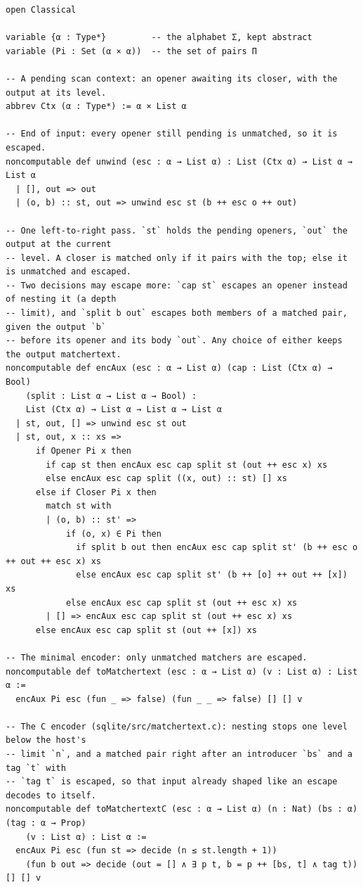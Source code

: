 \begin{lstlisting}
open Classical

variable {α : Type*}         -- the alphabet Σ, kept abstract
variable (Pi : Set (α × α))  -- the set of pairs Π

-- A pending scan context: an opener awaiting its closer, with the output at its level.
abbrev Ctx (α : Type*) := α × List α

-- End of input: every opener still pending is unmatched, so it is escaped.
noncomputable def unwind (esc : α → List α) : List (Ctx α) → List α → List α
  | [], out => out
  | (o, b) :: st, out => unwind esc st (b ++ esc o ++ out)

-- One left-to-right pass. `st` holds the pending openers, `out` the output at the current
-- level. A closer is matched only if it pairs with the top; else it is unmatched and escaped.
-- Two decisions may escape more: `cap st` escapes an opener instead of nesting it (a depth
-- limit), and `split b out` escapes both members of a matched pair, given the output `b`
-- before its opener and its body `out`. Any choice of either keeps the output matchertext.
noncomputable def encAux (esc : α → List α) (cap : List (Ctx α) → Bool)
    (split : List α → List α → Bool) :
    List (Ctx α) → List α → List α → List α
  | st, out, [] => unwind esc st out
  | st, out, x :: xs =>
      if Opener Pi x then
        if cap st then encAux esc cap split st (out ++ esc x) xs
        else encAux esc cap split ((x, out) :: st) [] xs
      else if Closer Pi x then
        match st with
        | (o, b) :: st' =>
            if (o, x) ∈ Pi then
              if split b out then encAux esc cap split st' (b ++ esc o ++ out ++ esc x) xs
              else encAux esc cap split st' (b ++ [o] ++ out ++ [x]) xs
            else encAux esc cap split st (out ++ esc x) xs
        | [] => encAux esc cap split st (out ++ esc x) xs
      else encAux esc cap split st (out ++ [x]) xs

-- The minimal encoder: only unmatched matchers are escaped.
noncomputable def toMatchertext (esc : α → List α) (v : List α) : List α :=
  encAux Pi esc (fun _ => false) (fun _ _ => false) [] [] v

-- The C encoder (sqlite/src/matchertext.c): nesting stops one level below the host's
-- limit `n`, and a matched pair right after an introducer `bs` and a tag `t` with
-- `tag t` is escaped, so that input already shaped like an escape decodes to itself.
noncomputable def toMatchertextC (esc : α → List α) (n : Nat) (bs : α) (tag : α → Prop)
    (v : List α) : List α :=
  encAux Pi esc (fun st => decide (n ≤ st.length + 1))
    (fun b out => decide (out = [] ∧ ∃ p t, b = p ++ [bs, t] ∧ tag t)) [] [] v


\end{lstlisting}
